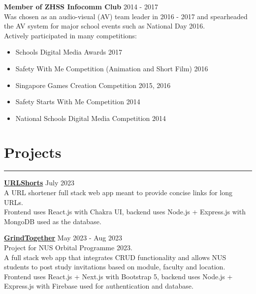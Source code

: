 \documentclass[letterpaper,11pt]{article}
\begin{document}
    \vspace{0.5em}
    \textbf{Member of ZHSS Infocomm Club} \hfill 2014 - 2017
    \\
    Was chosen as an audio-visual (AV) team leader in 2016 - 2017 and spearheaded the AV system for 
    major school events such as National Day 2016.
    \\
    \vspace{0.5em}
    Actively participated in many competitions:
    \\
    \vspace{-0.75em}
    \begin{itemize}[itemsep=-0.5em, label=\textbullet]
        \item Schools Digital Media Awards  \hfill 2017
        \item Safety With Me Competition (Animation and Short Film) \hfill 2016
        \item Singapore Games Creation Competition \hfill 2015, 2016
        \item Safety Starts With Me Competition \hfill 2014
        \item National Schools Digital Media Competition \hfill 2014
    \end{itemize}

     
    \section{Projects}
    \vspace{-0.5em}
    \hrule
    \vspace{0.5em}
    \textbf{\href {https://github.com/tjch-o/URLShorts}{URLShorts}} \hfill July 2023
    \\
    A URL shortener full stack web app meant to provide concise links for long URLs.
    \\
    Frontend uses React.js with Chakra UI, backend uses Node.js + Express.js with MongoDB used as 
    the database.

    \vspace{0.5em}
    \textbf{\href {https://github.com/McNaBry/orbital-grindtogether}{GrindTogether}} \hfill May 2023
    - Aug 2023
    \\
    Project for NUS Orbital Programme 2023.
    \\
    A full stack web app that integrates CRUD functionality and allows NUS students to post 
    study invitations based on module, faculty and location. 
    \\
    Frontend uses React.js + Next.js with Bootstrap 5, backend uses Node.js + Express.js with 
    Firebase used for authentication and database.
     
\end{document}
